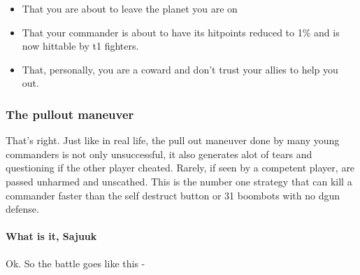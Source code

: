\documentclass[]{article}
\begin{document}
\begin{itemize}
	\item That you are about to leave the planet you are on
	\item That your commander is about to have its hitpoints reduced to 1\% and is now hittable by t1 fighters.
	\item That, personally, you are a coward and don't trust your allies to help you out.  
	
\end{itemize}

\subsubsection{The pullout maneuver}

That's right.  Just like in real life, the pull out maneuver done by many young commanders is not only unsuccessful, it also generates alot of tears and questioning if the other player cheated.  Rarely, if seen by a competent player, are passed unharmed and unscathed.  This is the number one strategy that can kill a commander faster than the self destruct button or 31 boombots with no dgun defense.  

\paragraph{What is it, Sajuuk}

Ok.  So the battle goes like this - 
\end{document}
